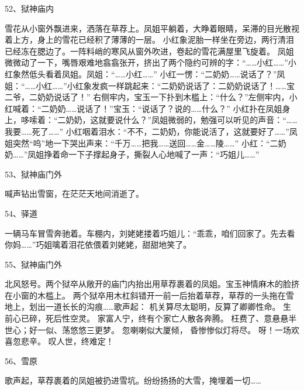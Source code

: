 52、狱神庙内\par
雪花从小窗外飘进来，洒落在草荐上。凤姐平躺着，大睁着眼睛，呆滞的目光散视着上方，身上的雪花已经积了薄薄的一层。
小红象泥胎一样坐在旁边，两行清泪已经冻在腮边了。一阵料峭的寒风从窗外吹进，卷起的雪花满屋里飞旋着。
凤姐微微动了一下，嘴唇艰难地翕翕张开，挤出了两个隐约可辨的字：“……小红……”小红象然低头看着凤姐。凤姐：“……小红……”
小红一愣：“二奶奶……说话了？”凤姐：“……小红……”小红象发疯一样跳起来：“二奶奶说话了：二奶奶说话了！……宝二爷，二奶奶说话了！”
右侧牢内，宝玉一下扑到木槛上：“什么？”左侧牢内，小红喊着：“二奶奶……说话了！”宝玉：“说话了？说的……什么？”
小红扑在凤姐身上，哆嗦着：“二奶奶，这就要说什么？”凤姐微弱的，勉强可以听见的声音：“……我要……死了……”
小红咽着泪水：“不不，二奶奶，你能说活了，这就要好了……”凤姐突然“呜”地一下哭出声来：“千万……把我……送回……金……陵……”
小红：“二奶奶……”凤姐挣着命一下子撑起身子，撕裂人心地喊了一声：“巧姐儿……”

53、狱神庙门外\par
喊声钻出雪窗，在茫茫天地间消逝了。

54、驿道\par
一辆马车冒雪奔驰着。车棚内，刘姥姥搂着巧姐儿：“乖乖，咱们回家了。先去看你妈……”巧姐噙着泪花依偎着刘姥姥，甜甜地笑了。

55、狱神庙门外\par
北风怒号。两个狱卒从敞开的庙门内抬出用草荐裹着的凤姐。宝玉神情麻木的脸挤在小窗的木槛上。
两个狱卒用木杠斜错开一前一后抬着草荐，草荐的一头拖在雪地上，划出一道长长的沟痕……歌声起：
机关算尽太聪明，反算了卿卿性命。
生前心已碎，死后性空灵。
家富人宁，终有个家亡人散各奔腾。
枉费了、意悬悬半世心；好一似、荡悠悠三更梦。
忽喇喇似大厦倾，
昏惨惨似灯将尽。
呀！一场欢喜忽悲辛。
叹人世，终难定！

56、雪原\par
歌声起，草荐裹着的凤姐被扔进雪坑。纷纷扬扬的大雪，掩埋着一切……

